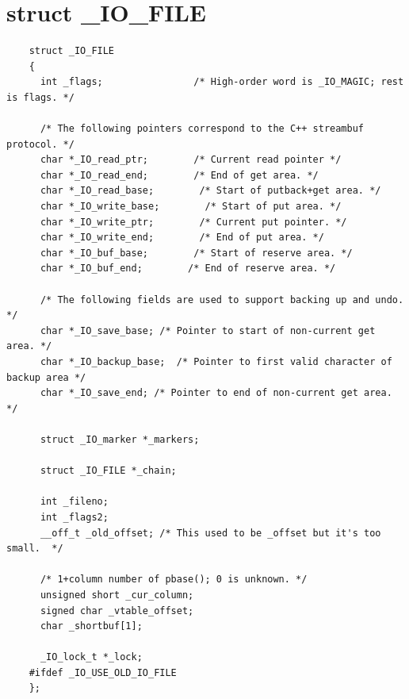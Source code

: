 \documentclass[12pt]{report}
\begin{document}
\section*{struct \_IO\_FILE}
\begin{lstlisting}
	struct _IO_FILE
	{
	  int _flags;                /* High-order word is _IO_MAGIC; rest is flags. */
	
	  /* The following pointers correspond to the C++ streambuf protocol. */
	  char *_IO_read_ptr;        /* Current read pointer */
	  char *_IO_read_end;        /* End of get area. */
	  char *_IO_read_base;        /* Start of putback+get area. */
	  char *_IO_write_base;        /* Start of put area. */
	  char *_IO_write_ptr;        /* Current put pointer. */
	  char *_IO_write_end;        /* End of put area. */
	  char *_IO_buf_base;        /* Start of reserve area. */
	  char *_IO_buf_end;        /* End of reserve area. */
	
	  /* The following fields are used to support backing up and undo. */
	  char *_IO_save_base; /* Pointer to start of non-current get area. */
	  char *_IO_backup_base;  /* Pointer to first valid character of backup area */
	  char *_IO_save_end; /* Pointer to end of non-current get area. */
	
	  struct _IO_marker *_markers;
	
	  struct _IO_FILE *_chain;
	
	  int _fileno;
	  int _flags2;
	  __off_t _old_offset; /* This used to be _offset but it's too small.  */
	
	  /* 1+column number of pbase(); 0 is unknown. */
	  unsigned short _cur_column;
	  signed char _vtable_offset;
	  char _shortbuf[1];
	
	  _IO_lock_t *_lock;
	#ifdef _IO_USE_OLD_IO_FILE
	};
	
\end{lstlisting}
\end{document}
